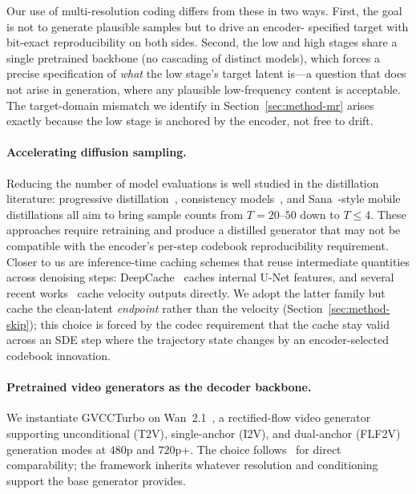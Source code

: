 Our use of multi-resolution coding differs from these in two ways. First,
the goal is not to generate plausible samples but to drive an encoder-
specified target with bit-exact reproducibility on both sides. Second, the
low and high stages share a single pretrained backbone (no cascading of
distinct models), which forces a precise specification of \emph{what} the
low stage's target latent is---a question that does not arise in
generation, where any plausible low-frequency content is acceptable. The
target-domain mismatch we identify in Section~\ref{sec:method-mr} arises
exactly because the low stage is anchored by the encoder, not free to drift.

\paragraph{Accelerating diffusion sampling.}
Reducing the number of model evaluations is well studied in the
distillation literature: progressive distillation~\cite{salimans2022progressive},
consistency models~\cite{song2023consistency,luo2023latent}, and
Sana~\cite{xie2024sana}-style mobile distillations all aim to bring sample
counts from $T = 20$--$50$ down to $T \le 4$. These approaches require
retraining and produce a distilled generator that may not be compatible
with the encoder's per-step codebook reproducibility requirement. Closer
to us are inference-time caching schemes that reuse intermediate
quantities across denoising steps: DeepCache~\cite{ma2024deepcache} caches
internal U-Net features, and several recent
works~\cite{kim2025inferencetime} cache velocity outputs directly. We
adopt the latter family but cache the clean-latent \emph{endpoint}
rather than the velocity (Section~\ref{sec:method-skip}); this choice is
forced by
the codec requirement that the cache stay valid across an SDE step where
the trajectory state changes by an encoder-selected codebook innovation.

\paragraph{Pretrained video generators as the decoder backbone.}
We instantiate GVCCTurbo on Wan~2.1~\cite{wan2025}, a rectified-flow
video generator supporting unconditional (T2V), single-anchor (I2V), and
dual-anchor (FLF2V) generation modes at $480$p and $720$p+. The choice
follows~\cite{zeng2026gvcc} for direct comparability; the framework
inherits whatever resolution and conditioning support the base generator
provides.
